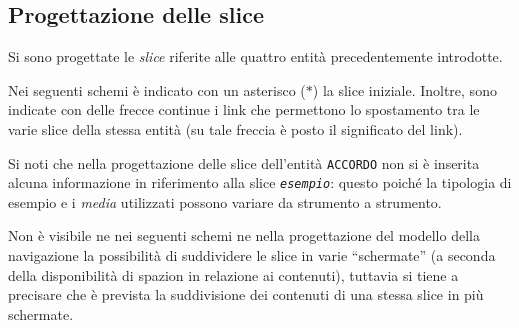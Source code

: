 \subsection{Progettazione delle slice}
Si sono progettate le \emph{slice} riferite alle quattro entità precedentemente
introdotte.

Nei seguenti schemi è indicato con un asterisco ($\ast$) la slice iniziale.
Inoltre, sono indicate con delle frecce continue i link che permettono lo
spostamento tra le varie slice della stessa entità (su tale freccia è posto il
significato del link).

Si noti che nella progettazione delle slice dell'entità \texttt{ACCORDO} non si
è inserita alcuna informazione in riferimento alla slice
\textit{\texttt{esempio}}: questo poiché la tipologia di esempio e i
\textit{media} utilizzati possono variare da strumento a strumento.

Non è visibile ne nei seguenti schemi ne nella progettazione del modello della
navigazione la possibilità di suddividere le slice in varie ``schermate'' (a
seconda della disponibilità di spazion in relazione ai contenuti), tuttavia si
tiene a precisare che è prevista la suddivisione dei contenuti di una stessa
slice in più schermate.

